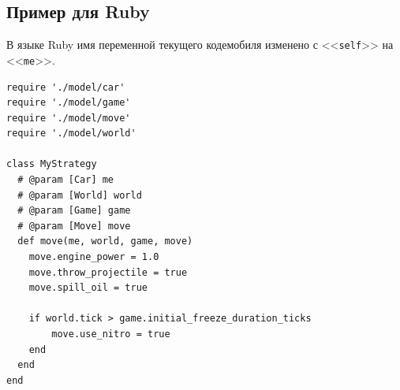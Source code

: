 \newpage
\subsection{Пример для Ruby}

В языке Ruby имя переменной текущего кодемобиля изменено с <<\texttt{self}>> на <<\texttt{me}>>.

\begin{verbatim}
require './model/car'
require './model/game'
require './model/move'
require './model/world'

class MyStrategy
  # @param [Car] me
  # @param [World] world
  # @param [Game] game
  # @param [Move] move
  def move(me, world, game, move)
    move.engine_power = 1.0
    move.throw_projectile = true
    move.spill_oil = true

    if world.tick > game.initial_freeze_duration_ticks
        move.use_nitro = true
    end
  end
end
\end{verbatim}
